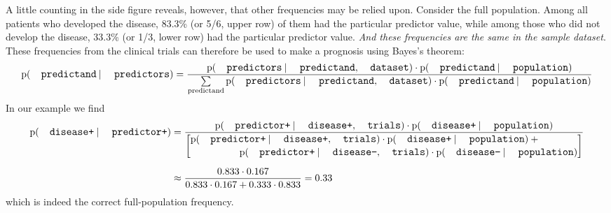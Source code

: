 \documentclass[utf8]{FrontiersinHarvard} %
\newcommand*{\p}{\mathrm{p}}%
\renewcommand*{\|}[1][]{\nonscript\:#1\vert\nonscript\:\mathopen{}}
\begin{document}
A little counting in the side figure reveals, however, that other frequencies may be relied upon. Consider the full population. Among all patients who developed the disease, 83.3\% (or 5/6, upper row) of them had the particular predictor value, while among those who did not develop the disease, 33.3\% (or 1/3, lower row) had the particular predictor value. \emph{And these frequencies are the same in the sample dataset}. These frequencies from the clinical trials can therefore be used to make a prognosis using Bayes's theorem:
\begin{equation}
  \label{eq:base-rate_correction}
  \p(\texttt{\small predictand} \| \texttt{\small predictors}) =
  \frac{
    \p(\texttt{\small predictors} \| \texttt{\small predictand},
  \texttt{\small dataset})
  \cdot   \p(\texttt{\small predictand} \| \texttt{\small population})
}{\sum\limits_{\text{predictand}}
    \p(\texttt{\small predictors} \| \texttt{\small predictand},
  \texttt{\small dataset})
  \cdot   \p(\texttt{\small predictand} \| \texttt{\small population})
}
\end{equation}
In our example we find
\begin{equation}
  \label{eq:base-rate_correction_example}
 \begin{split}
   \p(\texttt{\small disease+} \| \texttt{\small predictor+})
   &=
  \frac{
    \p(\texttt{\small predictor+} \| \texttt{\small disease+},
  \texttt{\small trials})
  \cdot   \p(\texttt{\small disease+} \| \texttt{\small population})
}{
  \biggl[\begin{aligned}
    &\p(\texttt{\small predictor+} \| \texttt{\small disease+},
  \texttt{\small trials}) 
  \cdot   \p(\texttt{\small disease+} \| \texttt{\small population})
  +{}\\[-0.5\jot]&\hspace{5em}
    \p(\texttt{\small predictor+} \| \texttt{\small disease\textminus},
  \texttt{\small trials})
  \cdot   \p(\texttt{\small disease\textminus} \| \texttt{\small population})
\end{aligned}\biggr]
} \\[2\jot]
&\approx
  \frac{ 0.833 \cdot 0.167}{0.833 \cdot 0.167 + 0.333 \cdot 0.833}
  = 0.33
  \end{split}
\end{equation}
which is indeed the correct full-population frequency.
\end{document}
